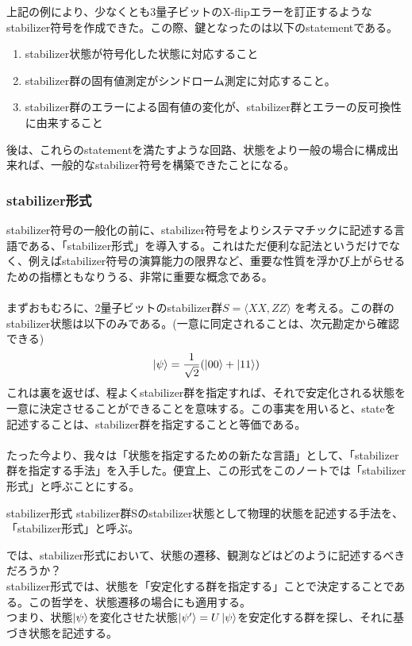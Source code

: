 \documentclass[a4paper,10.5pt]{article}
\numberwithin{equation}{section}
\begin{document}
上記の例により、少なくとも3量子ビットのX-flipエラーを訂正するようなstabilizer符号を作成できた。この際、鍵となったのは以下のstatementである。
\begin{enumerate}
    \item stabilizer状態が符号化した状態に対応すること
    \item stabilizer群の固有値測定がシンドローム測定に対応すること。
    \item stabilizer群のエラーによる固有値の変化が、stabilizer群とエラーの反可換性に由来すること
\end{enumerate}
後は、これらのstatementを満たすような回路、状態をより一般の場合に構成出来れば、一般的なstabilizer符号を構築できたことになる。
\subsubsection{stabilizer形式}
stabilizer符号の一般化の前に、stabilizer符号をよりシステマチックに記述する言語である、「stabilizer形式」を導入する。これはただ便利な記法というだけでなく、例えばstabilizer符号の演算能力の限界など、重要な性質を浮かび上がらせるための指標ともなりうる、非常に重要な概念である。\\
\\
まずおもむろに、2量子ビットのstabilizer群$S=\langle XX,ZZ\rangle$
を考える。この群のstabilizer状態は以下のみである。(一意に同定されることは、次元勘定から確認できる)
\begin{align*}
    \ket{\psi}=\frac{1}{\sqrt2}
(\ket{00}+\ket{11})
\end{align*}
これは裏を返せば、程よくstabilizer群を指定すれば、それで安定化される状態を一意に決定させることができることを意味する。この事実を用いると、stateを記述することは、stabilizer群を指定することと等価である。\\
\\
たった今より、我々は「状態を指定するための新たな言語」として、「stabilizer群を指定する手法」を入手した。便宜上、この形式をこのノートでは「stabilizer形式」と呼ぶことにする。
\begin{defbox}{stabilizer形式}
    stabilizer群Sのstabilizer状態として物理的状態を記述する手法を、「stabilizer形式」と呼ぶ。
\end{defbox}
では、stabilizer形式において、状態の遷移、観測などはどのように記述するべきだろうか？\\
stabilizer形式では、状態を「安定化する群を指定する」ことで決定することである。この哲学を、状態遷移の場合にも適用する。\\つまり、状態$\ket{\psi}$を変化させた状態$\ket{\psi'}=U\ket{\psi}$を安定化する群を探し、それに基づき状態を記述する。\\
\end{document}
